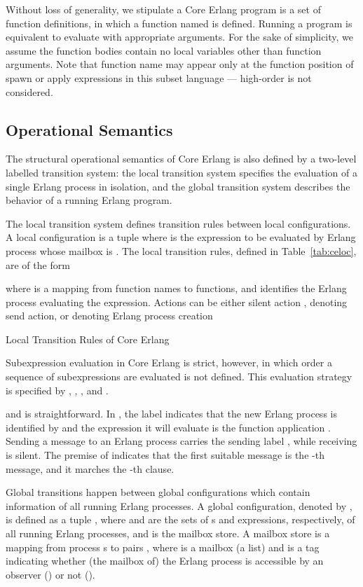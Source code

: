\documentclass[runningheads, envcountsame, a4paper]{llncs}
\begin{document}
Without loss of generality, we stipulate a Core Erlang program is a set of function definitions,
in which a function named  is defined.
Running a program is equivalent to evaluate  with appropriate arguments.
For the sake of simplicity, we assume the function bodies contain no local variables other than function arguments.
Note that function name may appear only at the function position of spawn or apply expressions
in this subset language --- high-order is not considered.



\subsection{Operational Semantics}
The structural operational semantics of Core Erlang is also defined by a two-level labelled transition system:
the local transition system specifies the evaluation of a single Erlang process in isolation,
and the global transition system describes the behavior of a running Erlang program.

The local transition system defines transition rules between local configurations.
A local configuration is a tuple  where  is the expression to be evaluated
by Erlang process whose mailbox is .
The local transition rules, defined in Table~\ref{tab:celoc}, are of the form

where  is a mapping from function names to functions,
and  identifies the Erlang process evaluating the expression.
Actions can be either silent action ,  denoting send action,
or  denoting Erlang process creation

\begin{table}

\caption{Local Transition Rules of Core Erlang}
\label{tab:celoc}
\end{table}
Subexpression evaluation in Core Erlang is strict, however, in which order a sequence of subexpressions are evaluated is not defined.
This evaluation strategy is specified by , , ,  and .

 and  is straightforward.
In , the  label indicates that the new Erlang process is identified by 
and the expression it will evaluate is the function application .
Sending a message to an Erlang process carries the sending label , while receiving is silent.
The premise of  indicates that the first suitable message is the -th message, and it marches the -th clause.

Global transitions happen between global configurations which contain information of all running Erlang processes.
A global configuration, denoted by , is defined as a tuple ,
where  and  are the sets of s and expressions, respectively, of all running Erlang processes, and  is the mailbox store.
A mailbox store  is a mapping from process s to pairs , where  is a mailbox (a list)
and  is a tag indicating whether (the mailbox of) the Erlang process is accessible by an observer () or not ().
\end{document}
